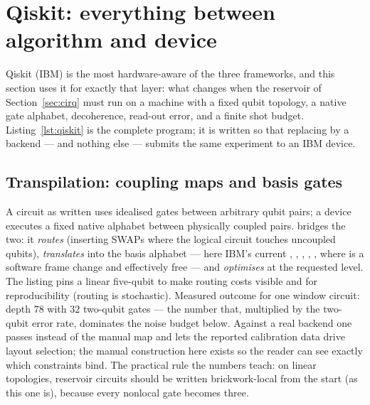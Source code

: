 \section{Qiskit: everything between algorithm and device}
\label{sec:qiskit}

Qiskit (IBM) is the most hardware-aware of the three frameworks, and this
section uses it for exactly that layer: what changes when the reservoir of
Section~\ref{sec:cirq} must run on a machine with a fixed qubit topology, a
native gate alphabet, decoherence, read-out error, and a finite shot budget.
Listing~\ref{lst:qiskit} is the complete program; it is written so that
replacing  by a  backend --- and
nothing else --- submits the same experiment to an IBM device.

\begin{strip}

\end{strip}

\subsection{Transpilation: coupling maps and basis gates}
\label{sec:transpilation}

A circuit as written uses idealised gates between arbitrary qubit pairs; a
device executes a fixed native alphabet between physically coupled pairs.
 bridges the two: it \emph{routes} (inserting SWAPs where the
logical circuit touches uncoupled qubits), \emph{translates} into the basis
alphabet --- here IBM's current , , , ,
, where  is a software frame change and effectively free ---
and \emph{optimises} at the requested level. The listing pins a linear
five-qubit  to make routing costs visible and
 for reproducibility (routing is stochastic). Measured
outcome for one window circuit: depth $78$ with $32$ two-qubit 
gates --- the number that, multiplied by the two-qubit error rate, dominates
the noise budget below. Against a real backend one passes
 instead of the manual map and lets the reported
calibration data drive layout selection; the manual construction here exists
so the reader can see exactly which constraints bind. The practical rule the
numbers teach: on linear topologies, reservoir circuits should be written
brickwork-local from the start (as this one is), because every nonlocal gate
becomes three.

